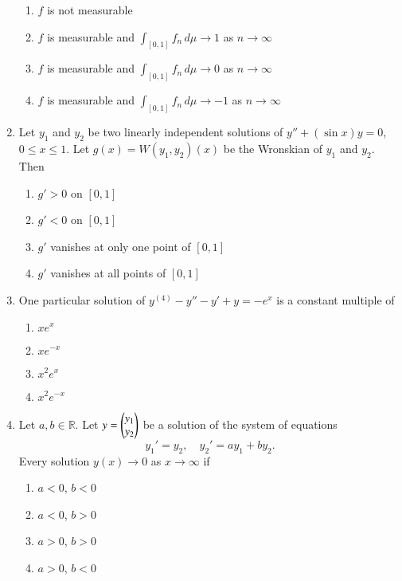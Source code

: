 \documentclass[journal]{IEEEtran}
\numberwithin{equation}{enumi}
\numberwithin{figure}{enumi}
\begin{document}
\begin{enumerate}
\begin{enumerate}
    \item $f$ is not measurable
    \item $f$ is measurable and $\int_{[0,1]} f_n \, d\mu \to 1$ as $n\to\infty$
    \item $f$ is measurable and $\int_{[0,1]} f_n \, d\mu \to 0$ as $n\to\infty$
    \item $f$ is measurable and $\int_{[0,1]} f_n \, d\mu \to -1$ as $n\to\infty$
\end{enumerate}

\item
Let $y_1$ and $y_2$ be two linearly independent solutions of $y'' + (\sin x)y = 0$, $0 \leq x \leq 1$. Let $g(x) = W(y_1, y_2)(x)$ be the Wronskian of $y_1$ and $y_2$. Then
\hfill{}
\begin{multicols}{2}
\begin{enumerate}
    \item $g' > 0$ on $[0,1]$
    \item $g' < 0$ on $[0,1]$
    \item $g'$ vanishes at only one point of $[0,1]$
    \item $g'$ vanishes at all points of $[0,1]$
\end{enumerate}
\end{multicols}


\item
One particular solution of $y^{(4)} - y'' - y' + y = -e^x$ is a constant multiple of
\hfill{}
\begin{multicols}{4}
\begin{enumerate}
    \item $x e^x$
    \item $x e^{-x}$
    \item $x^2 e^x$
    \item $x^2 e^{-x}$
\end{enumerate}
\end{multicols}


\item
Let $a, b \in \mathbb{R}$. Let $y = \begin{pmatrix}y_1 \\ y_2\end{pmatrix}$ be a solution of the system of equations
\[
y_1' = y_2, \quad y_2' = a y_1 + b y_2.
\]
Every solution $y(x) \to 0$ as $x \to \infty$ if
\hfill{}
\begin{multicols}{4}
\begin{enumerate}
    \item $a < 0$, $b < 0$
    \item $a < 0$, $b > 0$
    \item $a > 0$, $b > 0$
    \item $a > 0$, $b < 0$
\end{enumerate}    
\end{multicols}



\end{enumerate}
\end{document}
